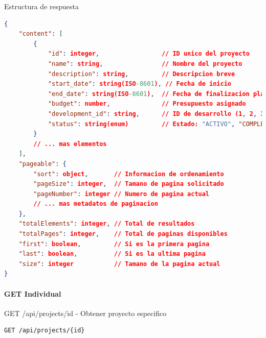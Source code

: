 \documentclass[11pt,a4paper]{article}
\begin{document}
\begin{center}
	\begin{minipage}{\textwidth}
		\begin{codebox}{Estructura de respuesta}
			\begin{lstlisting}[language=json]
{
    "content": [
        {
            "id": integer,                 // ID unico del proyecto
            "name": string,                // Nombre del proyecto
            "description": string,         // Descripcion breve
            "start_date": string(ISO-8601), // Fecha de inicio
            "end_date": string(ISO-8601),  // Fecha de finalizacion planificada
            "budget": number,              // Presupuesto asignado
            "development_id": string,      // ID de desarrollo (1, 2, 3)
            "status": string(enum)         // Estado: "ACTIVO", "COMPLETADO", "EN_PAUSA", "CANCELADO"
        }
        // ... mas elementos
    ],
    "pageable": {
        "sort": object,       // Informacion de ordenamiento
        "pageSize": integer,  // Tamano de pagina solicitado
        "pageNumber": integer // Numero de pagina actual
        // ... mas metadatos de paginacion
    },
    "totalElements": integer, // Total de resultados
    "totalPages": integer,    // Total de paginas disponibles
    "first": boolean,         // Si es la primera pagina
    "last": boolean,          // Si es la ultima pagina
    "size": integer           // Tamano de la pagina actual
}
\end{lstlisting}
		\end{codebox}
	\end{minipage}
\end{center}

\paragraph{GET Individual}

\begin{center}
	\begin{minipage}{\textwidth}
		\begin{codebox}{GET /api/projects/{id} - Obtener proyecto especifico}
			\begin{lstlisting}[language=HTTP]
GET /api/projects/{id}
\end{lstlisting}
		\end{codebox}
	\end{minipage}
\end{center}
\end{document}

